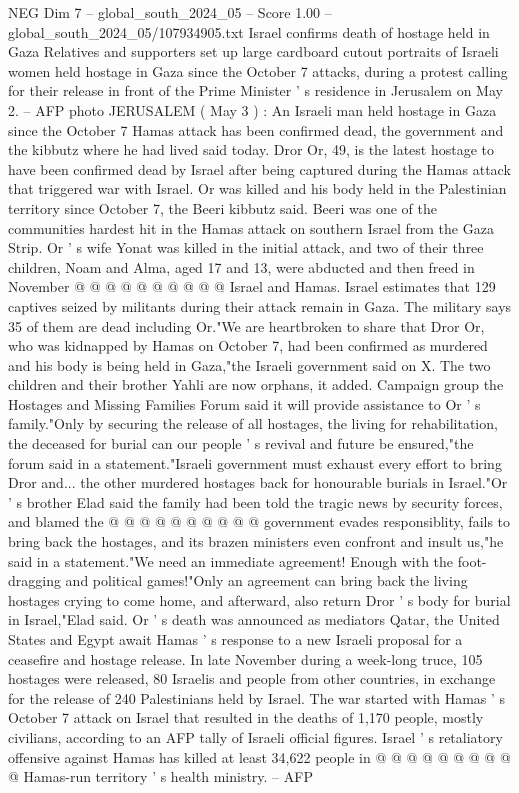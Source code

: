 \begin{textsample}{NEG Dim 7 – global\_south\_2024\_05 – Score 1.00 – global\_south\_2024\_05/107934905.txt}  \label{ex:f7_neg_249}
Israel confirms death of hostage held in Gaza Relatives and supporters set up large cardboard cutout portraits of Israeli women held hostage in Gaza since the October 7 attacks, during a protest calling for their release in front of the Prime Minister ' s residence in Jerusalem on May 2. -- AFP photo JERUSALEM ( May 3 ) : An Israeli man held hostage in Gaza since the October 7 Hamas attack has been confirmed dead, the government and the kibbutz where he had lived said today.
Dror Or, 49, is the latest hostage to have been confirmed dead by Israel after being captured during the Hamas attack that triggered war with Israel.
Or was killed and his body held in the Palestinian territory since October 7, the Beeri kibbutz said.
Beeri was one of the communities hardest hit in the Hamas attack on southern Israel from the Gaza Strip.
Or ' s wife Yonat was killed in the initial attack, and two of their three children, Noam and Alma, aged 17 and 13, were abducted and then freed in November @ @ @ @ @ @ @ @ @ @ Israel and Hamas.
Israel estimates that 129 captives seized by militants during their attack remain in Gaza.
The military says 35 of them are dead including Or."We are heartbroken to share that Dror Or, who was kidnapped by Hamas on October 7, had been confirmed as murdered and his body is being held in Gaza,"the Israeli government said on X.
The two children and their brother Yahli are now orphans, it added.
Campaign group the Hostages and Missing Families Forum said it will provide assistance to Or ' s family."Only by securing the release of all hostages, the living for rehabilitation, the deceased for burial can our people ' s revival and future be ensured,"the forum said in a statement."Israeli government must exhaust every effort to bring Dror and... the other murdered hostages back for honourable burials in Israel."Or ' s brother Elad said the family had been told the tragic news by security forces, and blamed the @ @ @ @ @ @ @ @ @ @ government evades responsiblity, fails to bring back the hostages, and its brazen ministers even confront and insult us,"he said in a statement."We need an immediate agreement!
Enough with the foot-dragging and political games!"Only an agreement can bring back the living hostages crying to come home, and afterward, also return Dror ' s body for burial in Israel,"Elad said.
Or ' s death was announced as mediators Qatar, the United States and Egypt await Hamas ' s response to a new Israeli proposal for a ceasefire and hostage release.
In late November during a week-long truce, 105 hostages were released, 80 Israelis and people from other countries, in exchange for the release of 240 Palestinians held by Israel.
The war started with Hamas ' s October 7 attack on Israel that resulted in the deaths of 1,170 people, mostly civilians, according to an AFP tally of Israeli official figures.
Israel ' s retaliatory offensive against Hamas has killed at least 34,622 people in @ @ @ @ @ @ @ @ @ @ Hamas-run territory ' s health ministry. -- AFP

\end{textsample}
